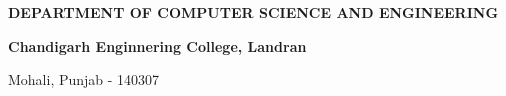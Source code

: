 \begin{center}
\vspace*{2\baselineskip}

\begin{flushbottom}

{\bfseries\fontsize{14}{30}\selectfont DEPARTMENT OF COMPUTER SCIENCE AND ENGINEERING}

\vspace*{\baselineskip}
{\bfseries\fontsize{14}{30}\selectfont Chandigarh Enginnering College, Landran}

\vspace*{\baselineskip}
{\fontsize{14}{30}\selectfont Mohali, Punjab  - 140307}

\end{flushbottom}
\end{center}
